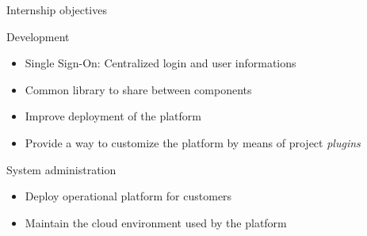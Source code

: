 \documentclass[10pt]{beamer}
\begin{document}
\begin{frame}{Internship objectives}
    \begin{block}{Development}
      \begin{itemize}
        \item Single Sign-On: Centralized login and user informations
        \item Common library to share between components
        \item Improve deployment of the platform
        \item Provide a way to customize the platform by means of project \textit{plugins}
      \end{itemize}
    \end{block}
    \begin{block}{System administration}
      \begin{itemize}
        \item Deploy operational platform for customers
        \item Maintain the cloud environment used by the platform
      \end{itemize}
    \end{block}
\end{frame}

\end{document}
